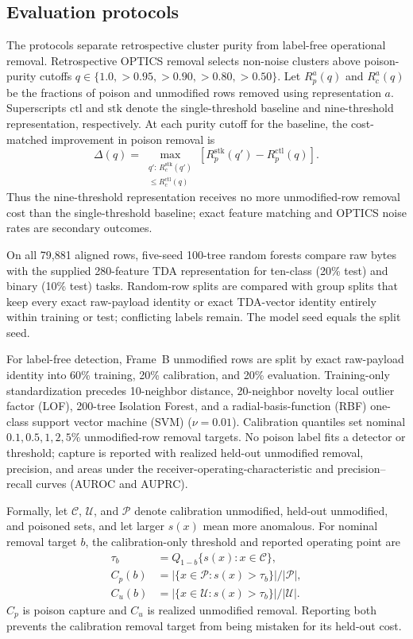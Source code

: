 \documentclass[conference]{IEEEtran}
\begin{document}
\subsection{Evaluation protocols}
The protocols separate retrospective cluster purity from label-free operational removal.
Retrospective OPTICS removal selects non-noise clusters above poison-purity
cutoffs $q\in\{1.0,>0.95,>0.90,>0.80,>0.50\}$. Let
$R_p^a(q)$ and $R_c^a(q)$ be the fractions of poison and unmodified rows
removed using representation $a$. Superscripts $\mathrm{ctl}$ and
$\mathrm{stk}$ denote the single-threshold baseline and nine-threshold
representation, respectively. At each purity cutoff for the baseline, the
cost-matched improvement in poison removal is
\begin{equation}
 \Delta(q)=
 \max_{\substack{q':\,R_c^{\mathrm{stk}}(q')\\
                  \le R_c^{\mathrm{ctl}}(q)}}
 \left[R_p^{\mathrm{stk}}(q')-R_p^{\mathrm{ctl}}(q)\right].
 \label{eq:matched}
\end{equation}
Thus the nine-threshold representation receives no more unmodified-row removal
cost than the single-threshold baseline; exact feature matching and OPTICS
noise rates are secondary outcomes.

On all 79,881 aligned rows, five-seed 100-tree random forests compare raw bytes
with the supplied 280-feature TDA representation for ten-class (20\% test) and
binary (10\% test) tasks. Random-row splits are compared with group splits that
keep every exact raw-payload identity or exact TDA-vector identity entirely
within training or test; conflicting labels remain. The model seed equals the split seed.

For label-free detection, Frame~B unmodified rows are split by exact raw-payload identity
into 60\% training, 20\% calibration, and 20\% evaluation. Training-only
standardization precedes 10-neighbor distance, 20-neighbor novelty local
outlier factor (LOF), 200-tree Isolation Forest, and a radial-basis-function
(RBF) one-class support vector machine (SVM)
($\nu=0.01$). Calibration quantiles set nominal $0.1,0.5,1,2,5\%$
unmodified-row removal targets. No poison label fits a
detector or threshold; capture is reported with realized held-out unmodified
removal, precision, and areas under the receiver-operating-characteristic and
precision--recall curves (AUROC and AUPRC).

Formally, let $\mathcal C$, $\mathcal U$, and $\mathcal P$ denote calibration
unmodified, held-out unmodified, and poisoned sets, and let larger $s(x)$ mean
more anomalous. For nominal removal target $b$, the calibration-only threshold and
reported operating point are
\begin{align}
 \tau_b &= Q_{1-b}\{s(x):x\in\mathcal C\}, \nonumber\\
 C_p(b) &= |\{x\in\mathcal P:s(x)>\tau_b\}|/|\mathcal P|, \nonumber\\
 C_u(b) &= |\{x\in\mathcal U:s(x)>\tau_b\}|/|\mathcal U|.
 \label{eq:novelty}
\end{align}
$C_p$ is poison capture and $C_u$ is realized unmodified removal. Reporting
both prevents the calibration removal target from being mistaken for its
held-out cost.
\end{document}
